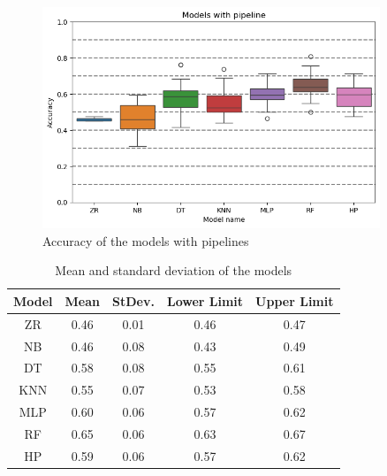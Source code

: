 \documentclass[review]{elsarticle}
\begin{document}

\begin{figure}[h]
    \centering
    \includegraphics[width=0.9\textwidth]{comparison_with_pipeline.png}
    \caption{Accuracy of the models with pipelines}
    \label{fig:models_comp}
\end{figure}

\begin{table}[h]
    \centering
    \begin{tabular}{|c|c|c|c|c|}
        \hline
        Model & Mean & StDev. & Lower Limit & Upper Limit \\
        \hline
        ZR & 0.46 & 0.01 & 0.46 & 0.47 \\
        NB & 0.46 & 0.08 & 0.43 & 0.49 \\
        DT & 0.58 & 0.08 & 0.55 & 0.61 \\
        KNN & 0.55 & 0.07 & 0.53 & 0.58 \\
        MLP & 0.60 & 0.06 & 0.57 & 0.62 \\
        RF & 0.65 & 0.06 & 0.63 & 0.67 \\
        HP & 0.59 & 0.06 & 0.57 & 0.62 \\
        \hline
    \end{tabular}
    \caption{Mean and standard deviation of the models}
    \label{tab:mean_std}
\end{table}

\end{document}
